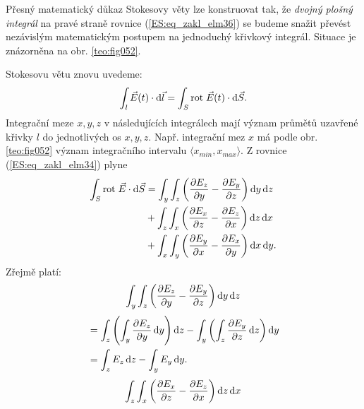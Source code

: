           
        
        Přesný matematický důkaz Stokesovy věty lze konstruovat tak, že \emph{dvojný plošný 
        integrál} na pravé straně rovnice (\ref{ES:eq_zakl_elm36}) se budeme snažit převést 
        nezávislým matematickým postupem na jednoduchý křivkový integrál. Situace je znázorněna na 
        obr. \ref{teo:fig052}.

       
        Stokesovu větu znovu uvedeme:
        \begin{equation*}
          \int_{l}\vec{E}(t)\cdot \mathop{}\!\mathrm{d}\vec{l} = \int_{S}\mathrm{rot}\;\vec{E}(t)\cdot \mathop{}\!\mathrm{d}\vec{S}.
        \end{equation*}
        Integrační meze \(x, y, z\) v následujících integrálech mají význam průmětů uzavřené křivky 
        \(l\) do jednotlivých os \(x, y, z\). Např. integrační mez \(x\) má podle obr. 
        \ref{teo:fig052} význam integračního intervalu \(\langle x_{min}, 
        x_{max}\rangle\). Z rovnice (\ref{ES:eq_zakl_elm34}) plyne
        \begin{align}\label{ES:eq_zakl_elm38}
          \int_S\mathrm{rot}\;\vec{E}\cdot \mathop{}\!\mathrm{d}\vec{S} 
             &= \int_y\int_z\left(\dfrac{\partial E_z}{\partial y} - \dfrac{\partial E_y}{\partial z}\right)\mathop{}\!\mathrm{d}y\mathop{}\!\mathrm{d}z \nonumber \\
             &+ \int_z\int_x\left(\dfrac{\partial E_x}{\partial z} - \dfrac{\partial E_z}{\partial x}\right)\mathop{}\!\mathrm{d}z\mathop{}\!\mathrm{d}x \nonumber \\
             &+ \int_x\int_y\left(\dfrac{\partial E_y}{\partial x} - \dfrac{\partial E_x}{\partial y}\right)\mathop{}\!\mathrm{d}x\mathop{}\!\mathrm{d}y. 
        \end{align}
        Zřejmě platí:
        \begin{equation*}
           \int_y\int_z\left(\dfrac{\partial E_z}{\partial y} - \dfrac{\partial E_y}{\partial z}\right)\mathop{}\!\mathrm{d}y\mathop{}\!\mathrm{d}z 
        \end{equation*}
        \begin{align*}
          {} &= \int_z\left(\int_y\dfrac{\partial E_z}{\partial y}\mathop{}\!\mathrm{d}y\right)\mathop{}\!\mathrm{d}z 
            - \int_y\left(\int_z\dfrac{\partial E_y}{\partial z}\mathop{}\!\mathrm{d}z\right)\mathop{}\!\mathrm{d}y                      \\
          {} &= \int_zE_z\mathop{}\!\mathrm{d}z - \int_yE_y\mathop{}\!\mathrm{d}y.                                    
        \end{align*}
        \begin{equation*}
          \int_z\int_x\left(\dfrac{\partial E_x}{\partial z} - \dfrac{\partial E_z}{\partial x}\right)\mathop{}\!\mathrm{d}z\mathop{}\!\mathrm{d}x
        \end{equation*}
